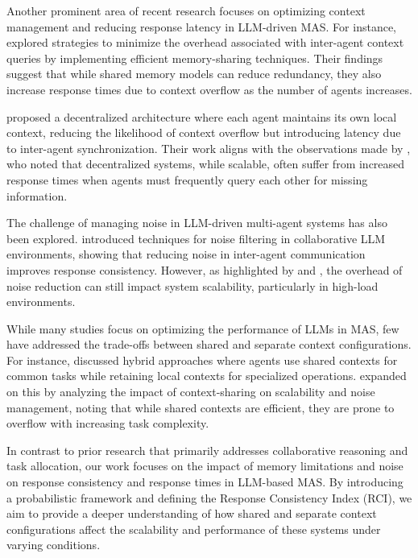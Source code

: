 \documentclass{article}
\begin{document}
Another prominent area of recent research focuses on optimizing context management and reducing response latency in LLM-driven MAS. For instance, \citet{zhao2023contextsharing} explored strategies to minimize the overhead associated with inter-agent context queries by implementing efficient memory-sharing techniques. Their findings suggest that while shared memory models can reduce redundancy, they also increase response times due to context overflow as the number of agents increases.

\citet{li2023decentralizedmas} proposed a decentralized architecture where each agent maintains its own local context, reducing the likelihood of context overflow but introducing latency due to inter-agent synchronization. Their work aligns with the observations made by \citet{kaminka2002multi}, who noted that decentralized systems, while scalable, often suffer from increased response times when agents must frequently query each other for missing information.

The challenge of managing noise in LLM-driven multi-agent systems has also been explored. \citet{huang2023noisereduction} introduced techniques for noise filtering in collaborative LLM environments, showing that reducing noise in inter-agent communication improves response consistency. However, as highlighted by \citet{durfee1991distributed} and \citet{foster2001grid}, the overhead of noise reduction can still impact system scalability, particularly in high-load environments.

While many studies focus on optimizing the performance of LLMs in MAS, few have addressed the trade-offs between shared and separate context configurations. For instance, \citet{parunak1999industrial} discussed hybrid approaches where agents use shared contexts for common tasks while retaining local contexts for specialized operations. \citet{ross2019probability} expanded on this by analyzing the impact of context-sharing on scalability and noise management, noting that while shared contexts are efficient, they are prone to overflow with increasing task complexity.

In contrast to prior research that primarily addresses collaborative reasoning and task allocation, our work focuses on the impact of memory limitations and noise on response consistency and response times in LLM-based MAS. By introducing a probabilistic framework and defining the Response Consistency Index (RCI), we aim to provide a deeper understanding of how shared and separate context configurations affect the scalability and performance of these systems under varying conditions.
\end{document}
